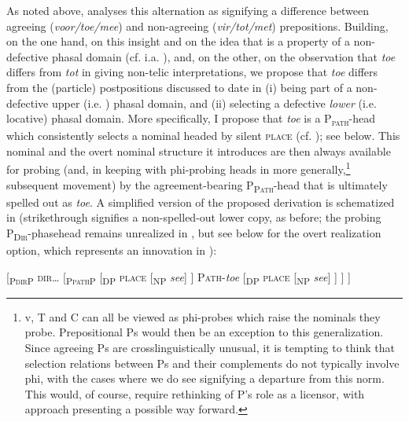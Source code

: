 \documentclass[output=paper]{LSP/langsci}
\begin{document}
As noted above,   \citet{DeVos2013} analyses this alternation as signifying a difference between agreeing (\textit{voor/toe/mee}) and non-agreeing (\textit{vir/tot/met}) prepositions. Building, on the one hand, on this insight and on the idea that  is a property of a non-defective phasal domain (cf. i.a. \citealt{Chomsky2001}), and, on the other, on the observation that \textit{toe} differs from \textit{tot} in giving non-telic  interpretations, we propose that \textit{toe} differs from the (particle) postpositions discussed to date in (i) being part of a non-defective upper (i.e. ) phasal domain, and (ii) selecting a defective \textit{lower} (i.e. locative) phasal domain. More specifically, I propose that \textit{toe} is a P\textsc{\textsubscript{path}}{}-head which consistently selects a nominal headed by silent \textsc{place} (cf. \citealt{Kayne2008expletives}); see  below. This nominal and the overt nominal structure it introduces are then always available for probing (and, in keeping with phi-probing heads in  more generally,\footnote{\label{fn:biberauer:44}%
v, T and C can all be viewed as phi-probes which raise the nominals they probe. Prepositional Ps would then be an exception to this generalization. Since agreeing Ps are crosslinguistically unusual, it is tempting to think that selection relations between Ps and their complements do not typically involve phi, with the cases where we do see  signifying a departure from this norm. This would, of course, require rethinking of P’s role as a licensor, with  approach presenting a possible way forward.}  subsequent movement) by the agreement-bearing P\textsc{\textsubscript{Path}}{}-head that is ultimately spelled out as \textit{toe}. A simplified version of the proposed derivation is schematized in  (strikethrough signifies a non-spelled-out lower copy, as before; the probing P\textsc{\textsubscript{Dir}}{}-phasehead remains unrealized in , but see  below for the overt realization option, which represents an innovation in ):



\ea%
    \label{ex:biberauer:51}
	  [\textsubscript{P\textsc{dir}P} \textsc{dir}… 
	    [\textsubscript{P\textsc{path}P}  
	      [\textsubscript{DP} \textsc{place} 
		[\textsubscript{NP} \textit{see}] 
	      ] \textsc{Path-}\textit{toe} 
	      [\textsubscript{DP} \textsc{place} 
		[\textsubscript{NP} \textit{see}] 
	      ]
	    ]
	  ]
\z
\end{document}
